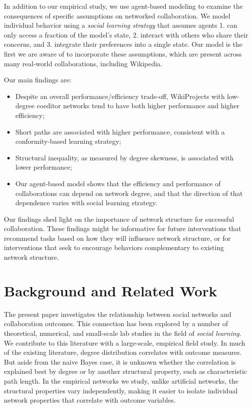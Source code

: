 \documentclass[letterpaper,twocolumn,10pt]{article}
\newcommand{\+}{\phantom{-}}
\begin{document}
In addition to our empirical study,
we use agent-based modeling to examine the consequences of specific
assumptions on networked collaboration.
We model individual behavior using a {\em social learning strategy} that
assumes agents 1. can only access a fraction of the model's state,
2. interact with others who share their concerns,
and 3. integrate their preferences into a single state.
Our model is the first we are aware of to incorporate these assumptions,
which are present across many real-world collaborations,
including Wikipedia.
\pagebreak

Our main findings are:
\begin{itemize}
\setlength\itemsep{0pt}
\item Despite an overall performance/efficiency trade-off,
WikiProjects with low-degree coeditor networks tend to have both higher performance and higher efficiency;
\item Short paths are associated with higher performance, consistent with a conformity-based learning strategy;
\item Structural inequality, as measured by degree skewness, is associated with lower performance;
\item Our agent-based model
shows that the efficiency and performance of collaborations can
depend on network degree,
and that the direction of that dependence varies with social learning strategy.
\end{itemize}

Our findings shed light on the importance of network structure for successful
collaboration.
These findings might be informative for future interventions that
recommend tasks based on how they will
influence network structure,
or for interventions that seek to encourage behaviors
complementary to existing network structure.

\section{Background and Related Work}
\label{sec:background}
The present paper investigates the relationship between social networks
and collaboration outcomes.
This connection has been explored by a number of theoretical,
numerical, and small-scale lab studies in the field of
{\em social learning}.
We contribute to this literature with a large-scale, empirical field study.
In much of the existing literature,
degree distribution correlates with outcome measures.
But aside from the naive Bayes case, it is unknown whether
the correlation is explained best by degree or by another structural property, such as characteristic path length.
In the empirical networks we study,
unlike artificial networks,
the structural properties vary independently,
making it easier to isolate individual
network properties that correlate with outcome variables.
\end{document}
